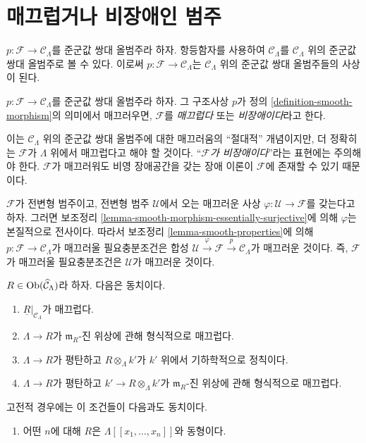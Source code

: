 \section{매끄럽거나 비장애인 범주}
\label{section-smooth}

\noindent
$p : \mathcal{F} \to \mathcal{C}_\Lambda$를 준군값 쌍대
올범주라 하자. 항등함자를 사용하여 $\mathcal{C}_\Lambda$를
$\mathcal{C}_\Lambda$ 위의 준군값 쌍대 올범주로 볼 수 있다. 이로써
$p : \mathcal{F} \longrightarrow \mathcal{C}_\Lambda$는
$\mathcal{C}_\Lambda$ 위의 준군값 쌍대 올범주들의 사상이 된다.

\begin{definition}
\label{definition-cofibered-groupoid-projection-smooth}
$p : \mathcal{F} \to \mathcal{C}_\Lambda$를 준군값 쌍대
올범주라 하자. 그 구조사상 $p$가 정의
\ref{definition-smooth-morphism}의 의미에서 매끄러우면,
$\mathcal{F}$를 {\it 매끄럽다} 또는 {\it 비장애이다}라고 한다.
\end{definition}

\noindent
이는 $\mathcal{C}_\Lambda$ 위의 준군값 쌍대 올범주에 대한
매끄러움의 ``절대적'' 개념이지만, 더 정확히는
$\mathcal{F}$가 $\Lambda$ 위에서 매끄럽다고 해야 할 것이다.
``{\it $\mathcal{F}$가 비장애이다}''라는 표현에는 주의해야 한다.
$\mathcal{F}$가 매끄러워도 비영 장애공간을 갖는 장애 이론이
$\mathcal{F}$에 존재할 수 있기 때문이다.

\begin{remark}
\label{remark-smooth-on-top}
$\mathcal{F}$가 전변형 범주이고, 전변형 범주 $\mathcal{U}$에서 오는
매끄러운 사상 $\varphi : \mathcal U \to \mathcal{F}$를 갖는다고 하자.
그러면 보조정리 \ref{lemma-smooth-morphism-essentially-surjective}에 의해
$\varphi$는 본질적으로 전사이다. 따라서 보조정리
\ref{lemma-smooth-properties}에 의해
$p: \mathcal{F} \to \mathcal{C}_\Lambda$가 매끄러울 필요충분조건은 합성
$\mathcal U \xrightarrow{\varphi} \mathcal{F} \xrightarrow{p}
\mathcal{C}_\Lambda$가 매끄러운 것이다. 즉, $\mathcal{F}$가
매끄러울 필요충분조건은 $\mathcal{U}$가 매끄러운 것이다.
\end{remark}

\begin{lemma}
\label{lemma-smooth}
$R \in \mathop{\mathrm{Ob}}\nolimits(\widehat{\mathcal{C}}_\Lambda)$라 하자. 다음은 동치이다.
\begin{enumerate}
\item $\underline{R}|_{\mathcal{C}_\Lambda}$가 매끄럽다.
\item $\Lambda \to R$가 $\mathfrak m_R$-진 위상에 관해 형식적으로
매끄럽다.
\item $\Lambda \to R$가 평탄하고 $R \otimes_\Lambda k'$가
$k'$ 위에서 기하학적으로 정칙이다.
\item $\Lambda \to R$가 평탄하고 $k' \to R \otimes_\Lambda k'$가
$\mathfrak m_R$-진 위상에 관해 형식적으로 매끄럽다.
\end{enumerate}
고전적 경우에는 이 조건들이 다음과도 동치이다.
\begin{enumerate}
\item[(5)] 어떤 $n$에 대해 $R$은 $\Lambda[[x_1, \ldots, x_n]]$와
동형이다.
\end{enumerate}
\end{lemma}

